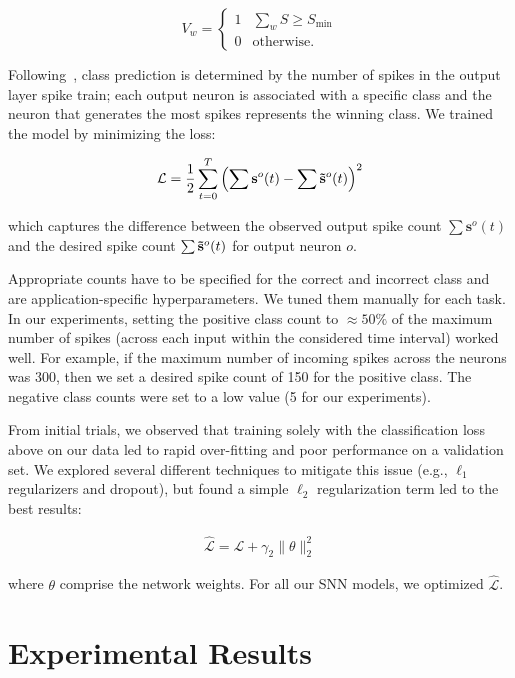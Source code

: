 \documentclass[fyp]{socreport}
\begin{document}
\begin{equation} \label{eqn:bin}
  V_w = \begin{cases}
    1 & \sum_{w} S \ge S_\text{min} \\
    0 & \text{otherwise.}
  \end{cases}
\end{equation}

Following~\cite{NIPS2018_7415}, class prediction is determined by the
number of spikes in the output layer spike train; each output neuron is
associated with a specific class and the neuron that generates the most spikes
represents the winning class. We trained the model by minimizing the loss:

\begin{align}
  \mathcal{L} = \frac{1}{2} \sum_{t=0}^T \left( \sum \mathbf{s}^o(t) - \sum \mathbf{\Tilde{s}}^o(t) \right)^2
\end{align}

which captures the difference between the observed output spike count
$\sum \mathbf{s}^o(t)$ and the desired spike count
$\sum \mathbf{\Tilde{s}}^o(t)$ for output neuron $o$.

Appropriate counts have to be specified for the correct and incorrect class and
are application-specific hyperparameters. We tuned them manually for each task.
In our experiments, setting the positive class count to $\approx 50\%$ of the
maximum number of spikes (across each input within the considered time interval)
worked well. For example, if the maximum number of incoming spikes across the
neurons was 300, then we set a desired spike count of 150 for the positive
class. The negative class counts were set to a low value (5 for our
experiments).

From initial trials, we observed that training solely with the classification
loss above on our data led to rapid over-fitting and poor performance on a
validation set. We explored several different techniques to mitigate this issue
(e.g., $\ell_1$ regularizers and dropout), but found a simple $\ell_2$
regularization term led to the best results:

\begin{align}
    \mathcal{\hat{L}} = \mathcal{L} +  \gamma_2 \| \theta \|^2_2
\end{align}

where $\theta$ comprise the network weights. For all our SNN models, we
optimized $\mathcal{\hat{L}}$.

\chapter{Experimental Results\label{cha:exp_results}}
\end{document}
